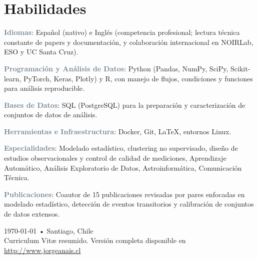 \documentclass[10pt, a4paper]{article}
\newcommand{\skillitem}[2]{
    \textbf{\textcolor{SlateGray}{#1}}: #2\par
}
\begin{document}
\section*{Habilidades}
\skillitem{Idiomas}{Español (nativo) e Inglés (competencia profesional; lectura técnica constante de papers y documentación, y colaboración internacional en NOIRLab, ESO y UC Santa Cruz).}
\skillitem{Programación y Análisis de Datos}{Python (Pandas, NumPy, SciPy, Scikit-learn, PyTorch, Keras, Plotly) y R, con manejo de flujos, condiciones y funciones para análisis reproducible.}
\skillitem{Bases de Datos}{SQL (PostgreSQL) para la preparación y caracterización de conjuntos de datos de análisis.}
\skillitem{Herramientas e Infraestructura}{Docker, Git, \LaTeX, entornos Linux.}
\skillitem{Especialidades}{Modelado estadístico, clustering no supervisado, diseño de estudios observacionales y control de calidad de mediciones, Aprendizaje Automático, Análisis Exploratorio de Datos, Astroinformática, Comunicación Técnica.}
\skillitem{Publicaciones}{Coautor de 15 publicaciones revisadas por pares enfocadas en modelado estadístico, detección de eventos transitorios y calibración de conjuntos de datos extensos.}



\vspace{1cm}
\begin{center}
{\small \today\- •\- Santiago, Chile}\\
{\scriptsize Curriculum Vit\ae{} resumido. Versión completa disponible en \href{http://www.jorgeanais.cl}{http://www.jorgeanais.cl}}
\end{center}
\end{document}
